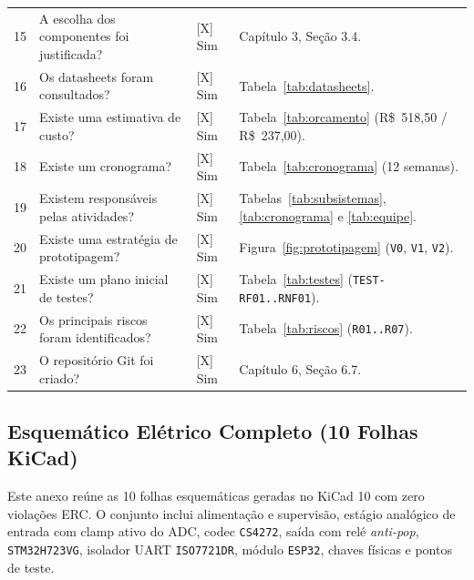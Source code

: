 \documentclass[12pt,openright,oneside,a4paper,brazil]{abntex2}
\begin{document}
\begin{table}[htbp]
\begin{tabularx}{\textwidth}{C{0.7cm}Y C{1.3cm}L{5.2cm}}
    15 & A escolha dos componentes foi justificada? & [X] Sim & Capítulo 3, Seção 3.4. \\
    16 & Os datasheets foram consultados? & [X] Sim & Tabela~\ref{tab:datasheets}. \\
    17 & Existe uma estimativa de custo? & [X] Sim & Tabela~\ref{tab:orcamento} (R\$~518,50 / R\$~237,00). \\
    18 & Existe um cronograma? & [X] Sim & Tabela~\ref{tab:cronograma} (12 semanas). \\
    19 & Existem responsáveis pelas atividades? & [X] Sim & Tabelas~\ref{tab:subsistemas}, \ref{tab:cronograma} e \ref{tab:equipe}. \\
    20 & Existe uma estratégia de prototipagem? & [X] Sim & Figura~\ref{fig:prototipagem} (\texttt{V0}, \texttt{V1}, \texttt{V2}). \\
    21 & Existe um plano inicial de testes? & [X] Sim & Tabela~\ref{tab:testes} (\texttt{TEST-RF01..RNF01}). \\
    22 & Os principais riscos foram identificados? & [X] Sim & Tabela~\ref{tab:riscos} (\texttt{R01..R07}). \\
    23 & O repositório Git foi criado? & [X] Sim & Capítulo 6, Seção 6.7. \\
    \bottomrule
  \end{tabularx}
\end{table}

\postextual



\begin{anexosenv}
\partanexos

\chapter{Esquemático Elétrico Completo (10 Folhas KiCad)}
Este anexo reúne as 10 folhas esquemáticas geradas no KiCad 10 com zero violações ERC. O conjunto inclui alimentação e supervisão, estágio analógico de entrada com clamp ativo do ADC, codec \texttt{CS4272}, saída com relé \textit{anti-pop}, \texttt{STM32H723VG}, isolador UART \texttt{ISO7721DR}, módulo \texttt{ESP32}, chaves físicas e pontos de teste.



\end{anexosenv}
\end{document}
